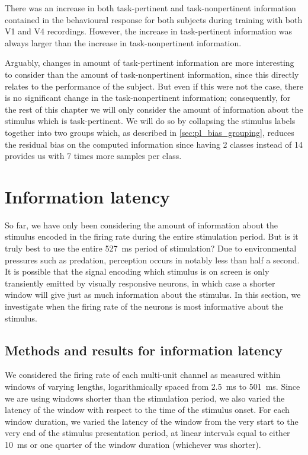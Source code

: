 There was an increase in both task-pertinent and task-nonpertinent information contained in the behavioural response for both subjects during training with both \ac{V1} and \ac{V4} recordings.
However, the increase in task-pertinent information was always larger than the increase in task-nonpertinent information.

Arguably, changes in amount of task-pertinent information are more interesting to consider than the amount of task-nonpertinent information, since this directly relates to the performance of the subject.
But even if this were not the case, there is no significant change in the task-nonpertinent information; consequently, for the rest of this chapter we will only consider the amount of information about the stimulus which is task-pertinent.
We will do so by collapsing the stimulus labels together into two groups which, as described in \autoref{sec:pl_bias_grouping}, reduces the residual bias on the computed information since having \num{2} classes instead of \num{14} provides us with \num{7} times more samples per class.


\section{Information latency}
\label{sec:pl_info_latency}

So far, we have only been considering the amount of information about the stimulus encoded in the firing rate during the entire stimulation period.
But is it truly best to use the entire \SI{527}{\milli\second} period of stimulation?
Due to environmental pressures such as predation, perception occurs in notably less than half a second.
It is possible that the signal encoding which stimulus is on screen is only transiently emitted by visually responsive neurons, in which case a shorter window will give just as much information about the stimulus.
In this section, we investigate when the firing rate of the neurons is most informative about the stimulus.


\subsection{Methods and results for information latency}

We considered the firing rate of each multi-unit channel as measured within windows of varying lengths, logarithmically spaced from \SI{2.5}{\milli\second} to \SI{501}{\milli\second}.
Since we are using windows shorter than the stimulation period, we also varied the latency of the window with respect to the time of the stimulus onset.
For each window duration, we varied the latency of the window from the very start to the very end of the stimulus presentation period, at linear intervals equal to either \SI{10}{\milli\second} or one quarter of the window duration (whichever was shorter).

